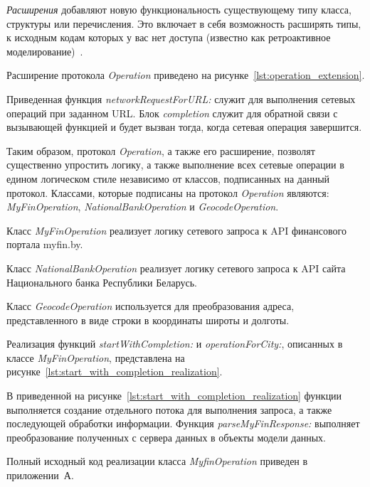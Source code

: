 \textit{Расширения} добавляют новую функциональность существующему типу класса,
структуры или перечисления. Это включает в себя возможность расширять типы,
к исходным кодам которых у вас нет доступа (известно как ретроактивное
моделирование)~\cite{swiftbook_extensions}.

Расширение протокола \textit{Operation} приведено на рисунке~\ref{lst:operation_extension}.


Приведенная функция \textit{networkRequestForURL:} служит для выполнения сетевых
операций при заданном URL. Блок \textit{completion} служит для обратной связи
с вызывающей функцией и будет вызван тогда, когда сетевая операция завершится.

Таким образом, протокол \textit{Operation}, а также его расширение, позволят
существенно упростить логику, а также выполнение всех сетевые операции
в едином логическом стиле независимо от классов, подписанных на данный протокол.
Классами, которые подписаны на протокол \textit{Operation} являются:
\textit{MyFinOperation}, \textit{NationalBankOperation} и \textit{GeocodeOperation}.

Класс \textit{MyFinOperation} реализует логику сетевого запроса к API
финансового портала myfin.by.

Класс \textit{NationalBankOperation} реализует логику сетевого запроса к API
сайта Национального банка Республики Беларусь.

Класс \textit{GeocodeOperation} используется для преобразования адреса,
представленного в виде строки в координаты широты и долготы.

Реализация функций \textit{startWithCompletion:} и \textit{operationForCity:},
описанных в классе \textit{MyFinOperation}, представлена
на рисунке~\ref{lst:start_with_completion_realization}.


В приведенной на рисунке~\ref{lst:start_with_completion_realization} функции
выполняется создание отдельного потока для выполнения запроса, а также
последующей обработки информации. Функция \textit{parseMyFinResponse:} выполняет
преобразование полученных с сервера данных в объекты модели данных.

Полный исходный код реализации класса \textit{MyfinOperation} приведен в приложении~А.

